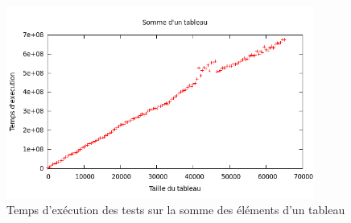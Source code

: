 \begin{figure}[H]
\centering
\includegraphics[width=0.9\textwidth]{figures/arraysum.png}
\caption{Temps d'exécution des tests sur la somme des éléments d'un tableau}
\label{fig:arraysum}
\end{figure}
